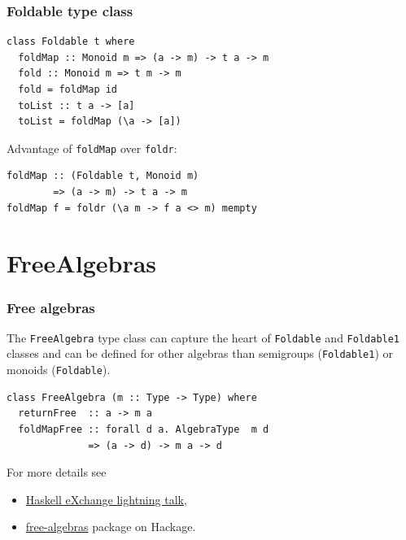 \documentclass[t,dvipsnames,hyperref={colorlinks,citecolor=NavyBlue,linkcolor=NavyBlue,anchorcolor=NavyBlue,urlcolor=NavyBlue}]{beamer}
\begin{document}
\begin{frame}[fragile]
  \frametitle{Foldable type class}
  \begin{verbatim}
class Foldable t where
  foldMap :: Monoid m => (a -> m) -> t a -> m
  fold :: Monoid m => t m -> m
  fold = foldMap id
  toList :: t a -> [a]
  toList = foldMap (\a -> [a]) 
  \end{verbatim}

  Advantage of \texttt{foldMap} over \texttt{foldr}:
  \begin{verbatim}
foldMap :: (Foldable t, Monoid m)
        => (a -> m) -> t a -> m
foldMap f = foldr (\a m -> f a <> m) mempty
  \end{verbatim}
\end{frame}

\section{FreeAlgebras}

\begin{frame}[fragile]
  \frametitle{Free algebras}
  {\small
    The \texttt{FreeAlgebra} type class can capture the heart of \texttt{Foldable} and
    \texttt{Foldable1} classes and can be defined for other algebras than
     semigroups (\texttt{Foldable1}) or monoids (\texttt{Foldable}).
  }
  \begin{verbatim}
class FreeAlgebra (m :: Type -> Type) where
  returnFree  :: a -> m a
  foldMapFree :: forall d a. AlgebraType  m d
              => (a -> d) -> m a -> d
  \end{verbatim}
  {\small
  For more details see
  \begin{itemize}
    \item[\bullet] \href{https://skillsmatter.com/skillscasts/13007-lightning-talk-rethinking-freeness-through-universal-algebra}{Haskell eXchange lightning talk},
    \item[\bullet] \href{https://hackage.haskell.org/package/free-algebras}{free-algebras}
      package on Hackage.
  \end{itemize}
  }
\end{frame}
\end{document}
